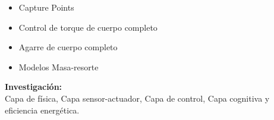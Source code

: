 {\begin{frame}
\begin{columns}[T]
\begin{column}{5.0cm}
{\begin{center}
\begin{itemize}
            \item Capture Points
            \item Control de torque de cuerpo completo
            \item Agarre de cuerpo completo
            \item Modelos Masa-resorte
            \end{itemize}
            \textbf{Investigaci\'on:}\\
            Capa de f\'isica, Capa sensor-actuador, Capa de control, Capa cognitiva y eficiencia energ\'etica.
          \end{center}
        }
      \end{column}
      \begin{column}{3.5cm}
\end{column}
\end{columns}
\end{frame}}

